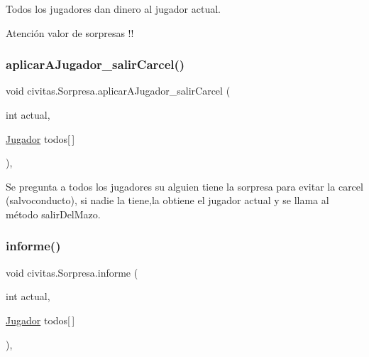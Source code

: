 Todos los jugadores dan dinero al jugador actual. \begin{DoxyWarning}{Atención}
valor de sorpresas !! 
\end{DoxyWarning}
\mbox{\label{classcivitas_1_1Sorpresa_aa51f171294077ccba991f03fae016a62}} 
\subsubsection{\texorpdfstring{aplicar\+A\+Jugador\+\_\+salir\+Carcel()}{aplicarAJugador\_salirCarcel()}}
{\footnotesize\ttfamily void civitas.\+Sorpresa.\+aplicar\+A\+Jugador\+\_\+salir\+Carcel (\begin{DoxyParamCaption}\item[{int}]{actual,  }\item[{\hyperlink{classcivitas_1_1Jugador}{Jugador}}]{todos\mbox{[}$\,$\mbox{]} }\end{DoxyParamCaption})\hspace{0.3cm}{\ttfamily [inline]}, {\ttfamily [private]}}

Se pregunta a todos los jugadores su alguien tiene la sorpresa para evitar la carcel (salvoconducto), si nadie la tiene,la obtiene el jugador actual y se llama al método salir\+Del\+Mazo. \mbox{\label{classcivitas_1_1Sorpresa_ae375d66b0f74795268b881d852b0f90f}} 
\subsubsection{\texorpdfstring{informe()}{informe()}}
{\footnotesize\ttfamily void civitas.\+Sorpresa.\+informe (\begin{DoxyParamCaption}\item[{int}]{actual,  }\item[{\hyperlink{classcivitas_1_1Jugador}{Jugador}}]{todos\mbox{[}$\,$\mbox{]} }\end{DoxyParamCaption})\hspace{0.3cm}{\ttfamily [inline]}, {\ttfamily [private]}}

